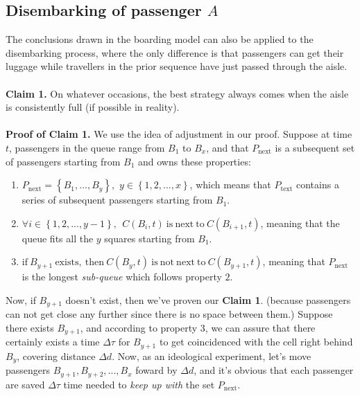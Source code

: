 \documentclass{article}
\begin{document}
	\subsection{Disembarking of passenger $A$}
	The conclusions drawn in the boarding model can also be applied to the disembarking process, where the only difference is that passengers can get their luggage while travellers in the prior sequence have just passed through the aisle.
	\\ \\
	\textbf{Claim 1.} On whatever occasions, the best strategy always comes when the aisle is consistently full (if possible in reality).
	\\ \\
	\textbf{Proof of Claim 1.} We use the idea of adjustment in our proof. Suppose at time \(t\), passengers in the queue range from \(B_1\) to \(B_x\), and that \(P_\mathrm{next}\) is a subsequent set of passengers starting from \(B_1\) and owns these properties:
	\begin{enumerate}
		\item \(P_{\mathrm{next}}=\left\{ B_1,...,B_y \right\} ,\,\,y\in \left\{ 1,2,...,x \right\} \), which means that \(P_{\mathrm{text}}\) contains a series of subsequent passengers starting from \(B_1\).
		\item \(\forall i\in \left\{ 1,2,...,y-1 \right\} ,\:\:C\left( B_i,t \right) \:\mathrm{is}\:\mathrm{next}\:\mathrm{to}\:C\left( B_{i+1},t \right) \), meaning that the queue fits all the \(y\) squares starting from \(B_1\).
		\item \(\mathrm{if}\:B_{y+1}\:\mathrm{exists},\:\mathrm{then}\:C\left( B_y,t \right) \:\mathrm{is}\:\mathrm{not}\:\mathrm{next}\:\mathrm{to}\:C\left( B_{y+1},t \right) \), meaning that \(P_{\mathrm{next}}\) is the longest \textit{sub-queue} which follows property \(2\).
	\end{enumerate}

	Now, if \(B_{y+1}\) doesn't exist, then we've proven our \textbf{Claim 1}. (because passengers can not get close any further since there is no space between them.) Suppose there exists \(B_{y+1}\), and according to property \(3\), we can assure that there certainly exists a time $\Delta\tau$ for \(B_{y+1}\) to get coincidenced with the cell right behind \(B_y\), covering distance \(\Delta d\). Now, as an ideological experiment, let's move passengers \(B_{y+1},B_{y+2},...,B_x\) foward by \(\Delta d\), and it's obvious that each passenger are saved \(\Delta \tau\) time needed to \textit{keep up with} the set \(P_{\mathrm{next}}\).
\end{document}
